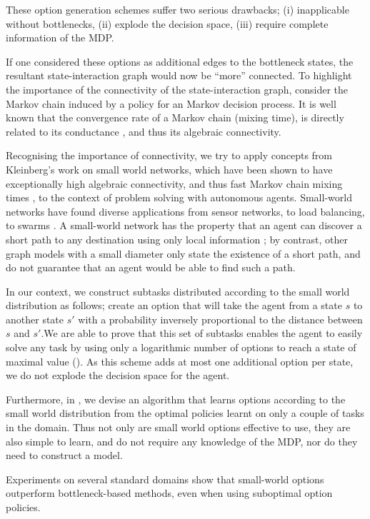 These option generation schemes suffer two serious drawbacks; (i)
inapplicable without bottlenecks, (ii) explode the decision space, (iii)
require complete information of the MDP.

If one considered these options as additional edges to the bottleneck
states, the resultant state-interaction graph would now be ``more''
connected. To highlight the importance of the connectivity of the
state-interaction graph, consider the Markov chain induced by a policy
for an Markov decision process. It is well known that the convergence
rate of a Markov chain (mixing time), is directly related to its
conductance \cite{Jerrum1988}, and thus its algebraic connectivity.

Recognising the importance of connectivity, we try to apply concepts
from Kleinberg's work on small world networks, which have been shown to
have exceptionally high algebraic connectivity, and thus fast Markov
chain mixing times \cite{Salehi2007}, to the context of problem solving
with autonomous agents. Small-world networks have found diverse
applications from sensor networks, to load balancing, to swarms
\cite{Saber2005}. A small-world network has the property that an agent
can discover a short path to any destination using only local
information \cite{Kleinberg2000}; by contrast, other graph models with
a small diameter only state the existence of a short path, and do not
guarantee that an agent would be able to find such a path.  

In our context, we construct subtasks distributed according to the small
world distribution as follows; create an option that will take the agent
from a state $s$ to another state $s'$ with a probability inversely
proportional to the distance between $s$ and $s'$.We are able to prove
that this set of subtasks enables the agent to easily solve any task by
using only a logarithmic number of options to reach a state of maximal
value (). As this scheme adds at most one additional
option per state, we do not explode the decision space for the agent.

Furthermore, in , we devise an algorithm that learns
options according to the small world distribution from the optimal
policies learnt on only a couple of tasks in the domain. Thus not only
are small world options effective to use, they are also simple to learn,
and do not require any knowledge of the MDP, nor do they need to
construct a model. 

Experiments on several standard domains show that small-world options
outperform bottleneck-based methods, even when using suboptimal option
policies. 

